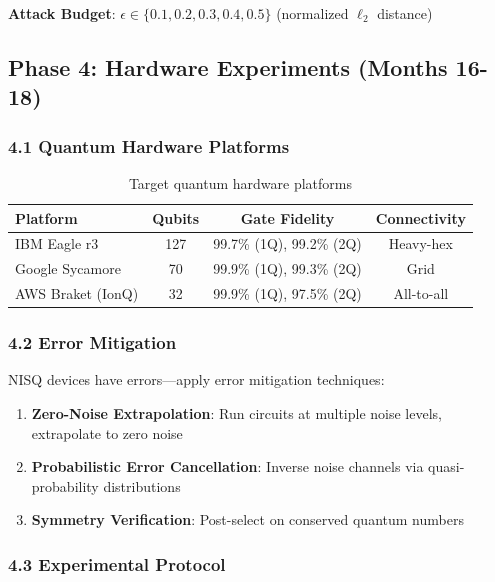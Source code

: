 \documentclass[11pt]{article}
\begin{document}
\textbf{Attack Budget}: $\epsilon \in \{0.1, 0.2, 0.3, 0.4, 0.5\}$ (normalized $\ell_2$ distance)

\subsection{Phase 4: Hardware Experiments (Months 16-18)}

\subsubsection{4.1 Quantum Hardware Platforms}

\begin{table}[h]
\centering
\small
\begin{tabular}{lccc}
\toprule
\textbf{Platform} & \textbf{Qubits} & \textbf{Gate Fidelity} & \textbf{Connectivity} \\
\midrule
IBM Eagle r3 & 127 & 99.7\% (1Q), 99.2\% (2Q) & Heavy-hex \\
Google Sycamore & 70 & 99.9\% (1Q), 99.3\% (2Q) & Grid \\
AWS Braket (IonQ) & 32 & 99.9\% (1Q), 97.5\% (2Q) & All-to-all \\
\bottomrule
\end{tabular}
\caption{Target quantum hardware platforms}
\end{table}

\subsubsection{4.2 Error Mitigation}

NISQ devices have errors—apply error mitigation techniques:

\begin{enumerate}
    \item \textbf{Zero-Noise Extrapolation}: Run circuits at multiple noise levels, extrapolate to zero noise
    \item \textbf{Probabilistic Error Cancellation}: Inverse noise channels via quasi-probability distributions
    \item \textbf{Symmetry Verification}: Post-select on conserved quantum numbers
\end{enumerate}

\subsubsection{4.3 Experimental Protocol}
\end{document}
